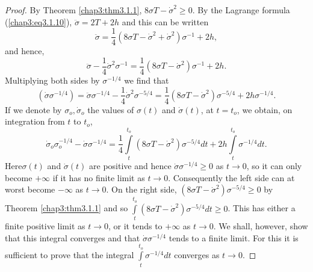 \begin{proof}
By Theorem \ref{chap3:thm3.1.1}, $8 \sigma T - \dot{\sigma}^2 \geq
0$. By the Lagrange formula (\ref{chap3:eq3.1.10}), $\ddot{\sigma} = 2
T + 2h$ and this can be written 
$$
\ddot{\sigma} = \frac{1}{4} (8\sigma T - \dot{\sigma}^2+
\dot{\sigma}^2) \sigma^{-1} + 2h,  
$$
and hence,
\begin{equation*}
\ddot{\sigma} - \frac{1}{4}  \dot{\sigma}^2 \sigma^{-1} = \frac{1}{4}
(8\sigma T - \dot{\sigma}^2) \sigma^{-1} +
2h. \tag{3.1.14}\label{chap3:eq3.1.14} 
\end{equation*}
Multiplying both sides by $\sigma^{-1/4}$ we find that 
$$
\left(\dot{\sigma} \sigma^{-1/4} \right) = \ddot{\sigma} \sigma^{-1/4}
- \frac{1}{4} \dot{\sigma}^2 \sigma^{-5/4} = \frac{1}{4} (8 \sigma T -
\dot{\sigma}^2) \sigma^{-5/4} + 2h \sigma^{-1/4}.  
$$
If we denote by $\sigma_o, \dot{\sigma}_o$ the values of $\sigma (t)$
and $\dot{\sigma}(t)$, at $t = t_o$, we obtain, on integration from
$t$ to $t_o$, 
\begin{equation*}
\dot{\sigma}_o \sigma_o^{-1/4} - \dot{\sigma} \sigma^{-1/4} =
\frac{1}{4} \int\limits^{t_o}_{t} (8 \sigma T - \dot{\sigma}^2)
\sigma^{-5/4}dt  + 2h \int\limits^{t_o}_{t} \sigma^{-1/4}
dt. \tag{3.1.15}\label{chap3:eq3.1.15} 
\end{equation*}
Here\pageoriginale $\sigma(t)$ and $\dot{\sigma}(t)$ are positive and
hence $\dot{\sigma} \sigma^{-1/4} \geq 0$ as $t \to 0$, so it can only
become $+ \infty$ if it has no finite limit as $t \to 0$. Consequently
the left side can at worst become $-\infty$ as $t \to 0$. On the right
side, $(8 \sigma T - \dot{\sigma}^2) \sigma^{-5/4} \geq 0$ by Theorem
\ref{chap3:thm3.1.1} and so $\int\limits^{t_o}_t (8\sigma T - \dot{\sigma}^2)
\sigma^{-5/4} dt \geq 0$. This has either a finite positive limit as
$t \to 0$, or it tends to $+ \infty$ as $t \to 0$. We shall, however,
show that this integral converges and that $\dot{\sigma}
\sigma^{-1/4}$ tends to a finite limit. For this it is sufficient to
prove that the integral $\int\limits^{t_o}_t  \sigma^{-1/4} dt$
converges as $t \to 0$. 


\end{proof}
